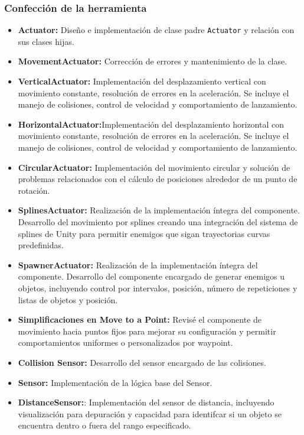 \subsubsection*{Confección de la herramienta}
\begin{itemize}
	\item \textbf{Actuator:} Diseño e implementación de clase padre \texttt{Actuator} y relación con sus clases hijas.
\item \textbf{MovementActuator:}  Corrección de errores y mantenimiento de la clase.
  \item \textbf{VerticalActuator:} Implementación del desplazamiento vertical con movimiento constante, resolución de errores en la aceleración. Se incluye el manejo
de colisiones, control de velocidad y comportamiento de lanzamiento.

  \item \textbf{HorizontalActuator:}Implementación del desplazamiento horizontal con movimiento constante, resolución de errores en la aceleración. Se incluye el manejo
de colisiones, control de velocidad y comportamiento de lanzamiento.
  \item \textbf{CircularActuator:} Implementación del movimiento circular y solución de problemas relacionados con el cálculo de posiciones alrededor de un punto de rotación.
  \item \textbf{SplinesActuator:} Realización de la implementación íntegra del
componente. Desarrollo del movimiento por splines creando una integración del sistema de splines de Unity para permitir enemigos que sigan trayectorias curvas predefinidas.
  \item \textbf{SpawnerActuator:} Realización de la implementación íntegra del
componente. Desarrollo del componente encargado de generar enemigos u objetos, incluyendo control por intervalos, posición, número de repeticiones y listas de objetos y posición.
  \item \textbf{Simplificaciones en Move to a Point:} Revisé el componente de movimiento hacia puntos fijos para mejorar su configuración y permitir comportamientos uniformes o personalizados por waypoint.
  \item \textbf{Collision Sensor:}  Desarrollo del sensor encargado de las colisiones.
  \item \textbf{Sensor:} Implementación de la lógica base del Sensor. 
  \item \textbf{DistanceSensor:}: Implementación del sensor de distancia, incluyendo visualización para depuración y capacidad para identifcar si un objeto se encuentra dentro o fuera del rango especificado.

\end{itemize}
